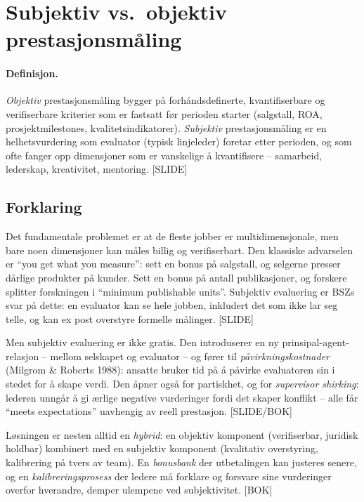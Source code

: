 \section{Subjektiv vs.\ objektiv prestasjonsmåling}\label{thr:subjective-vs-objective-performance}

\paragraph{Definisjon.} \emph{Objektiv} prestasjonsmåling bygger på forhåndsdefinerte, kvantifiserbare og verifiserbare kriterier som er fastsatt før perioden starter (salgstall, ROA, prosjektmilestones, kvalitetsindikatorer). \emph{Subjektiv} prestasjonsmåling er en helhetsvurdering som evaluator (typisk linjeleder) foretar etter perioden, og som ofte fanger opp dimensjoner som er vanskelige å kvantifisere -- samarbeid, lederskap, kreativitet, mentoring. [SLIDE]

\subsection*{Forklaring}

Det fundamentale problemet er at de fleste jobber er multidimensjonale, men bare noen dimensjoner kan måles billig og verifiserbart. Den klassiske advarselen er ``you get what you measure'': sett en bonus på salgstall, og selgerne presser dårlige produkter på kunder. Sett en bonus på antall publikasjoner, og forskere splitter forskningen i ``minimum publishable units''. Subjektiv evaluering er BSZs svar på dette: en evaluator kan se hele jobben, inkludert det som ikke lar seg telle, og kan ex post overstyre formelle målinger. [SLIDE]

Men subjektiv evaluering er ikke gratis. Den introduserer en ny prinsipal-agent-relasjon -- mellom selskapet og evaluator -- og fører til \emph{påvirkningskostnader} (Milgrom \& Roberts 1988): ansatte bruker tid på å påvirke evaluatoren sin i stedet for å skape verdi. Den åpner også for partiskhet, og for \emph{supervisor shirking}: lederen unngår å gi ærlige negative vurderinger fordi det skaper konflikt -- alle får ``meets expectations'' uavhengig av reell prestasjon. [SLIDE/BOK]

Løsningen er nesten alltid en \emph{hybrid}: en objektiv komponent (verifiserbar, juridisk holdbar) kombinert med en subjektiv komponent (kvalitativ overstyring, kalibrering på tvers av team). En \emph{bonusbank} der utbetalingen kan justeres senere, og en \emph{kalibreringsprosess} der ledere må forklare og forsvare sine vurderinger overfor hverandre, demper ulempene ved subjektivitet. [BOK]


